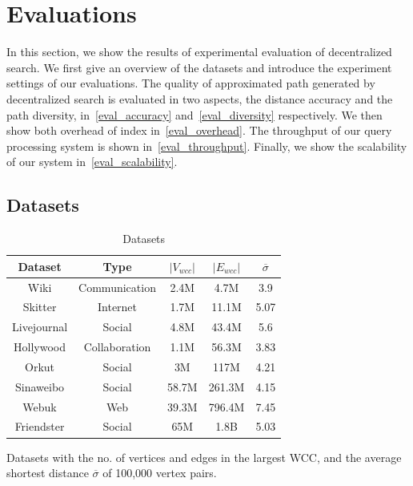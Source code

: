 \section{Evaluations}
\label{evaluation}

In this section, we show the results of experimental evaluation of decentralized search. We first give an overview of the datasets and introduce the experiment settings of our evaluations. The quality of approximated path generated by decentralized search is evaluated in two aspects, the distance accuracy and the path diversity, in~\ref{eval_accuracy} and~\ref{eval_diversity} respectively. We then show both overhead of index in~\ref{eval_overhead}. The throughput of our query processing system is shown in~\ref{eval_throughput}. Finally, we show the scalability of our system in~\ref{eval_scalability}.

\subsection{Datasets}
\label{eval_datasets}

\begin{table}
		\vspace{-0.5cm}
		\caption{Datasets}
		\label{table:datasets}
		\begin{threeparttable}
			\centering
			\begin{tabular}{c|cccc} \hline
				Dataset & Type & $|V_{wcc}|$ & $|E_{wcc}|$ & $\overline{\sigma}$ \\ \hline
				Wiki & Communication & 2.4M & 4.7M & 3.9 \\ 
				Skitter & Internet & 1.7M & 11.1M & 5.07 \\ 
				Livejournal & Social & 4.8M & 43.4M & 5.6 \\ 
				Hollywood & Collaboration & 1.1M & 56.3M & 3.83 \\ 
				Orkut & Social & 3M & 117M & 4.21 \\ 
				Sinaweibo & Social & 58.7M & 261.3M & 4.15 \\ 
				Webuk & Web & 39.3M & 796.4M & 7.45 \\ 
				Friendster & Social & 65M & 1.8B & 5.03 \\ \hline
			\end{tabular}
			\begin{tablenotes}
				\item Datasets with the no. of vertices and edges in the largest WCC, and the average shortest distance $\overline{\sigma}$ of 100,000 vertex pairs.
			\end{tablenotes}
		\end{threeparttable}
		\vspace{-0.3cm}
\end{table}

